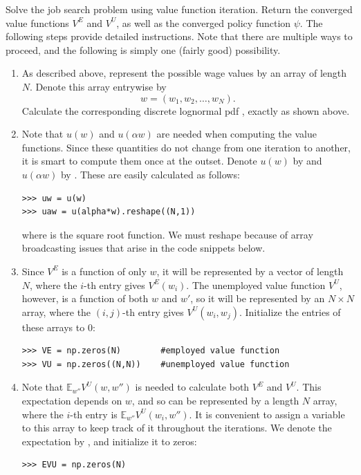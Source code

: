 \begin{problem}
Solve the job search problem using value function iteration. Return the converged value functions
$V^E$ and $V^U$, as well as the converged policy function $\psi$. The following steps provide detailed
instructions. Note that there are multiple ways to proceed, and the following is simply one (fairly good)
possibility.
\begin{enumerate}

   \item As described above, represent the possible wage values by an array  of length
   $N$. Denote this array entrywise by
   \[
   w = (w_1,w_2,\ldots,w_N).
   \]
   Calculate the corresponding discrete lognormal pdf , exactly as shown above.

   \item Note that $u(w)$ and $u(\alpha w)$ are needed when computing the value functions.
   Since these quantities do not change from one iteration to another, it is smart to
   compute them once at the outset. Denote $u(w)$ by  and $u(\alpha w)$ by .
   These are easily calculated as follows:
\begin{lstlisting}
>>> uw = u(w)
>>> uaw = u(alpha*w).reshape((N,1))
\end{lstlisting}
    where  is the square root function. We must reshape  because of array broadcasting
    issues that arise in the code snippets below.

   \item Since $V^E$ is a function of only $w$, it will be represented by a vector of length $N$, where
   the $i$-th entry gives $V^E(w_i)$. The unemployed value function $V^U$, however,
   is a function of both $w$ and $w'$, so it will be represented by an $N \times N$ array,
   where the $(i,j)$-th entry gives $V^U(w_i,w_j)$. Initialize the entries of these arrays to 0:
\begin{lstlisting}
>>> VE = np.zeros(N)        #employed value function
>>> VU = np.zeros((N,N))    #unemployed value function
\end{lstlisting}

   \item Note that $\mathbb{E}_{w''}V^U(w,w'')$  is needed to calculate both $V^E$ and $V^U$.
   This expectation depends on $w$, and so can be represented by a length $N$ array, where the
   $i$-th entry is $\mathbb{E}_{w''}V^U(w_i,w'')$.
   It is convenient to assign a variable to this array to keep track of it throughout the iterations.
   We denote the expectation by , and initialize it to zeros:
\begin{lstlisting}
>>> EVU = np.zeros(N)
\end{lstlisting}


\end{enumerate}
\end{problem}
